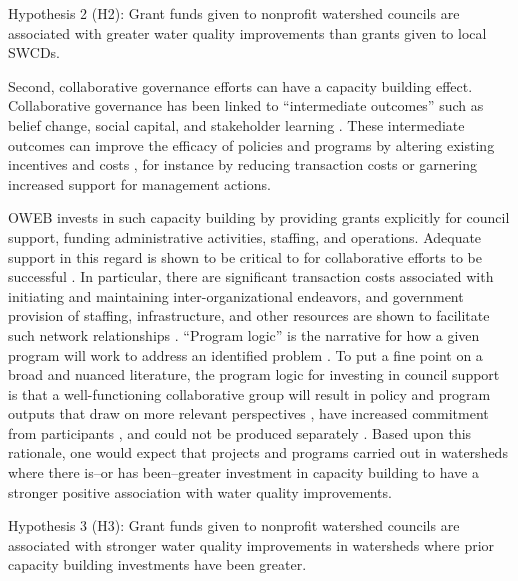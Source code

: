 \documentclass[12pt,a4paper,titlepage]{article}
\begin{document}
\begin{description}
\item{Hypothesis 2 (H2): Grant funds given to nonprofit watershed councils are associated with greater water quality improvements than grants given to local SWCDs.}
\end{description}

Second, collaborative governance efforts can have a capacity building effect. Collaborative governance has been linked to “intermediate outcomes” \parencite{carr2012} such as belief change, social capital, and stakeholder learning \parencite[e.g.,][]{leach2013,gerlak2011,calanni2014}. These intermediate outcomes can improve the efficacy of policies and programs by altering existing incentives and costs \parencite{schneider2003}, for instance by reducing transaction costs or garnering increased support for management actions.

OWEB invests in such capacity building by providing grants explicitly for council support, funding administrative activities, staffing, and operations. Adequate support in this regard is shown to be critical to for collaborative efforts to be successful \parencite{lubell2009}. In particular, there are significant transaction costs associated with initiating and maintaining inter-organizational endeavors, and government provision of staffing, infrastructure, and other resources are shown to facilitate such network relationships \parencite{schneider2003}. “Program logic” \parencite{bickman1987} is the narrative for how a given program will work to address an identified problem \parencite{margerum2011,mclaughlin1999}. To put a fine point on a broad and nuanced literature, the program logic for investing in council support is that a well-functioning collaborative group will result in policy and program outputs that draw on more relevant perspectives \parencite{ansell2008,oleary2006,leach2006}, have increased commitment from participants \parencite{bryson2006,ansell2008}, and could not be produced separately \parencite{emerson2012}. Based upon this rationale, one would expect that projects and programs carried out in watersheds where there is--or has been--greater investment in capacity building to have a stronger positive association with water quality improvements.

\begin{description}
\item{Hypothesis 3 (H3): Grant funds given to nonprofit watershed councils are associated with stronger water quality improvements in watersheds where prior capacity building investments have been greater.}
\end{description}
\end{document}
